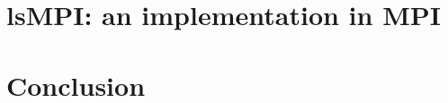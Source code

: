 \documentclass[pdftex,final]{pittetd}   %
\begin{document}
\chapter{\texorpdfstring{\MakeLowercase{ls}MPI}{lsMPI}: an implementation in MPI}
\label{chapter:implementation}


\chapter{Conclusion}
\label{chapter:summary}
%



%
\end{document}
